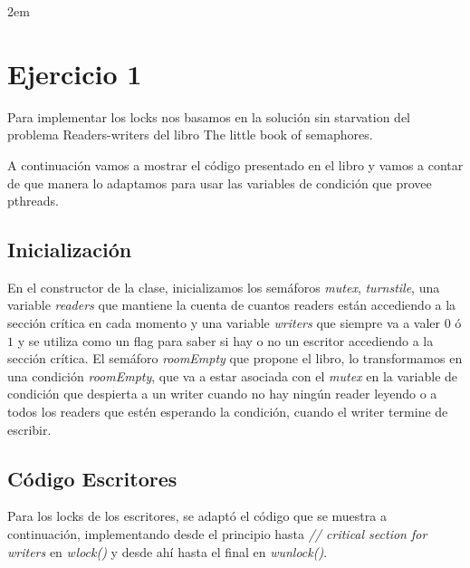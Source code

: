 \documentclass[a4paper,11pt]{article}
\begin{document}

\maketitle

\parindent 2em %
\parskip 4pt %
\renewcommand{\baselinestretch}{1.5}



\setcounter{section}{0}

\newpage

\section{Ejercicio 1}
Para implementar los locks nos basamos en la solución sin starvation del problema Readers-writers del libro The little book of semaphores.

A continuación vamos a mostrar el código presentado en el libro y vamos a contar de que manera lo adaptamos para usar las variables de condición que provee pthreads.

\subsection{Inicialización}
En el constructor de la clase, inicializamos los semáforos \emph{mutex}, \emph{turnstile}, una variable \emph{readers} que mantiene la cuenta de cuantos readers están accediendo a la sección crítica en cada momento y una variable \emph{writers} que siempre va a valer $0$ ó $1$ y se utiliza como un flag para saber si hay o no un escritor accediendo a la sección crítica. El semáforo \emph{roomEmpty} que propone el libro, lo transformamos en una condición \emph{roomEmpty}, que va a estar asociada con el \emph{mutex} en la variable de condición que despierta a un writer cuando no hay ningún reader leyendo o a todos los readers que estén esperando la condición, cuando el writer termine de escribir.


\subsection{Código Escritores}
Para los locks de los escritores, se adaptó el código que se muestra a continuación, implementando desde el principio hasta \emph{// critical section for writers} en \emph{wlock()} y desde ahí hasta el final en \emph{wunlock()}.
\end{document}
